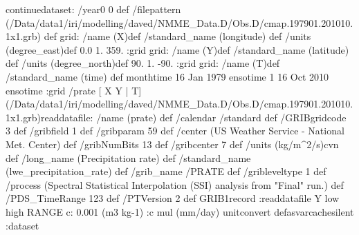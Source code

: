 \begin{ingrid}
continuedataset:
 /year0 0 def
 /filepattern (/Data/data1/iri/modelling/daved/NMME_Data.D/Obs.D/cmap.197901.201010.1x1.grb) def
grid:
/name (X)def
/standard_name (longitude) def
/units (degree_east)def
 0.0 1. 359.
:grid
grid:
/name (Y)def
/standard_name (latitude) def
/units (degree_north)def
 90. 1. -90.
:grid
grid:
/name (T)def
/standard_name (time) def
monthtime
16 Jan 1979 ensotime
1
16 Oct 2010 ensotime
:grid
 /prate{
[ X Y | T] (/Data/data1/iri/modelling/daved/NMME_Data.D/Obs.D/cmap.197901.201010.1x1.grb)readdatafile:
/name (prate) def
 /calendar /standard def
 /GRIBgridcode 3 def
 /gribfield 1 def
 /gribparam 59 def
 /center (US Weather Service - National Met. Center) def
 /gribNumBits 13 def
 /gribcenter 7 def
 /units (kg/m^2/s)cvn def
 /long_name (Precipitation rate) def
 /standard_name (lwe_precipitation_rate) def
 /grib_name /PRATE def
 /gribleveltype 1 def
 /process (Spectral Statistical Interpolation (SSI) analysis from "Final" run.) def
 /PDS_TimeRange 123 def
 /PTVersion 2 def
 GRIB1record :readdatafile
Y low high RANGE
c: 0.001 (m3 kg-1) :c
mul (mm/day) unitconvert
}defasvarcachesilent
:dataset
\end{ingrid}

